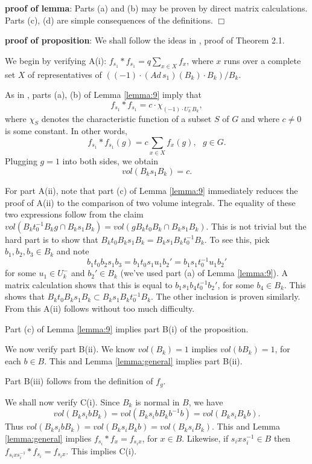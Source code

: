 {\bf proof of lemma}: Parts (a) and (b) 
may be proven by direct matrix calculations. 
Parts (c), (d) are simple consequences of the definitions.
$\Box$

{\bf proof of proposition}: We shall follow the ideas in 
\cite{H}, proof of Theorem 2.1.

We begin by verifying A(i): $f_{s_1}*f_{s_1}=q\sum_{x\in X} f_x$, 
where $x$ runs over a complete set $X$ of representatives
of $((-1)\cdot (Ad\, s_1)(B_k)\cdot B_k)/B_k$. 

As in \cite{H}, parts (a), (b) of Lemma 
\ref{lemma:9} imply that 
\[
f_{s_1}*f_{s_1}=c\cdot \chi_{(-1)\cdot U^-_kB_k},
\]
where $\chi_S$ denotes the characteristic function of
a subset $S$ of $G$ and where $c\not= 0$ is some constant. 
In other words,
\[
f_{s_1}*f_{s_1}(g)=c\sum_{x\in X} f_x(g) ,\ \ \ g\in G.
\]
Plugging $g=1$ into both sides, we obtain
\[
vol(B_k s_1 B_k)=c.
\]

For part A(ii), note that part (c) of Lemma \ref{lemma:9}
immediately reduces the proof of A(ii) to the 
comparison of two volume integrals. 
The equality of these two expressions follow from the claim
$vol(B_kt_0^{-1}B_kg\cap B_ks_1B_k)
=vol(gB_kt_0B_k\cap B_ks_1B_k)$.
This is not trivial but the hard part is to show that 
$B_kt_0B_ks_1B_k=B_ks_1B_kt_0^{-1}B_k$. To see this, 
pick $b_1,b_2,b_3\in B_k$ and note 
\[
b_1t_0b_2s_1b_3=b_1t_0s_1u_1b_2'
=b_1s_1t_0^{-1}u_1b_2'
\]
for some $u_1\in U_k^-$ and $b_2'\in B_k$
(we've used part (a) of Lemma \ref{lemma:9}). A matrix calculation
shows that this is equal to $b_1s_1b_4t_0^{-1}b_2'$, for some
$b_4\in B_k$. This shows that $B_kt_0B_ks_1B_k\subset 
B_ks_1B_kt_0^{-1}B_k$. The other inclusion is proven similarly.
From this A(ii) follows without too much difficulty.

Part (c) of Lemma \ref{lemma:9} implies part B(i) of the 
proposition.

We now verify part B(ii). We know $vol(B_k)=1$ implies $vol(bB_k)=1$,
for each $b\in B$. 
This and Lemma \ref{lemma:general} implies part B(ii).

Part B(iii) follows from the definition of $f_g$.

We shall now verify C(i). Since $B_k$ is normal in $B$, we have
\[
vol(B_k s_i b B_k)=vol(B_k s_i b B_k b^{-1} b)=
vol(B_k s_i B_kb).
\]
Thus $vol(B_k s_i b B_k)=vol(B_k s_i B_k b)=vol(B_k s_i B_k)$.
This and Lemma \ref{lemma:general} implies 
$f_{s_i}*f_x=f_{s_ix}$, for $x\in B$. Likewise, if
$s_ixs_i^{-1}\in B$ then $f_{s_ixs_i^{-1}}*f_{s_i}=f_{s_ix}$.
This implies C(i).

